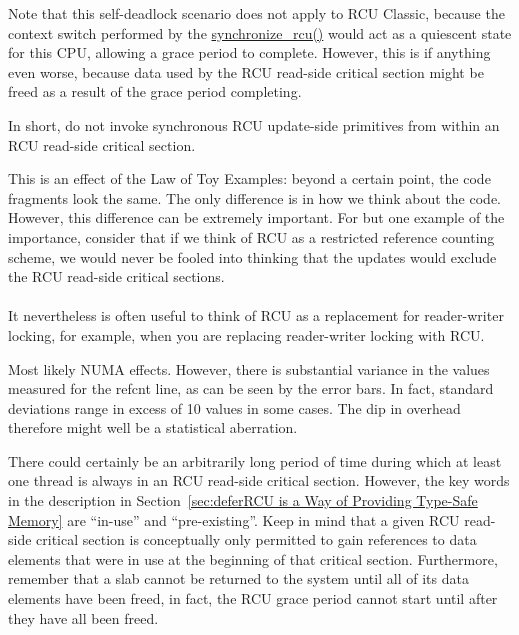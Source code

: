 Note that this self-deadlock scenario does not apply to
RCU Classic, because the context switch performed by the
\url{synchronize_rcu()} would act as a quiescent state
for this CPU, allowing a grace period to complete.
However, this is if anything even worse, because data used
by the RCU read-side critical section might be freed as a
result of the grace period completing.

In short, do not invoke synchronous RCU update-side primitives
from within an RCU read-side critical section.


This is an effect of the Law of Toy Examples:
beyond a certain point, the code fragments look the same.
The only difference is in how we think about the code.
However, this difference can be extremely important.
For but one example of the importance, consider that if we think
of RCU as a restricted reference counting scheme, we would never
be fooled into thinking that the updates would exclude the RCU
read-side critical sections.
\\ ~ \\
It nevertheless is often useful to think of RCU as a replacement
for reader-writer locking, for example, when you are replacing reader-writer
locking with RCU.


Most likely NUMA effects.
However, there is substantial variance in the values measured for the
refcnt line, as can be seen by the error bars.
In fact, standard deviations range in excess of 10%
values in some cases.
The dip in overhead therefore might well be a statistical aberration.


	There could certainly be an arbitrarily long period of time
	during which at least one thread is always in an RCU read-side
	critical section.
	However, the key words in the description in
	Section~\ref{sec:deferRCU is a Way of Providing Type-Safe Memory}
	are ``in-use'' and ``pre-existing''.
	Keep in mind that a given RCU read-side critical section is
	conceptually only permitted to gain references to data elements
	that were in use at the beginning of that critical section.
	Furthermore, remember that a slab cannot be returned to the
	system until all of its data elements have been freed, in fact,
	the RCU grace period cannot start until after they have all been
	freed.

